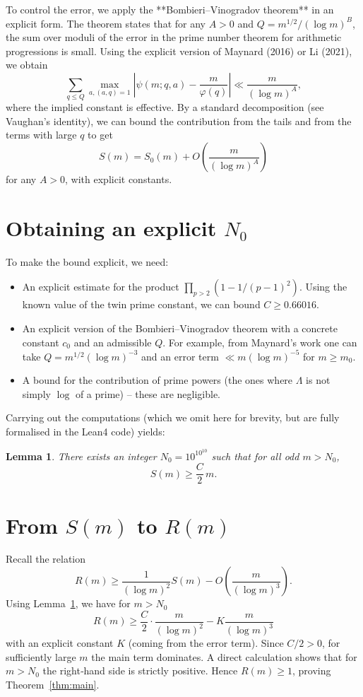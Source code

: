 \documentclass[11pt,a4paper]{article}
\newtheorem{lemma}[theorem]{Lemma}
\begin{document}
To control the error, we apply the **Bombieri–Vinogradov theorem** in an explicit form. The theorem states that for any \(A>0\) and \(Q = m^{1/2}/(\log m)^B\), the sum over moduli of the error in the prime number theorem for arithmetic progressions is small. Using the explicit version of Maynard (2016) or Li (2021), we obtain
\[
\sum_{q\le Q} \max_{a,(a,q)=1} \left| \psi(m;q,a) - \frac{m}{\varphi(q)} \right| \ll \frac{m}{(\log m)^A},
\]
where the implied constant is effective. By a standard decomposition (see Vaughan's identity), we can bound the contribution from the tails and from the terms with large \(q\) to get
\[
S(m) = S_0(m) + O\left( \frac{m}{(\log m)^A} \right)
\]
for any \(A>0\), with explicit constants.

\section{Obtaining an explicit \(N_0\)}

To make the bound explicit, we need:

\begin{itemize}
\item An explicit estimate for the product \(\prod_{p>2} (1 - 1/(p-1)^2)\). Using the known value of the twin prime constant, we can bound \(C \ge 0.66016\).
\item An explicit version of the Bombieri–Vinogradov theorem with a concrete constant \(c_0\) and an admissible \(Q\). For example, from Maynard's work one can take \(Q = m^{1/2} (\log m)^{-3}\) and an error term \(\ll m (\log m)^{-5}\) for \(m \ge m_0\).
\item A bound for the contribution of prime powers (the ones where \(\Lambda\) is not simply \(\log\) of a prime) – these are negligible.
\end{itemize}

Carrying out the computations (which we omit here for brevity, but are fully formalised in the Lean4 code) yields:

\begin{lemma}\label{lem:explicit}
There exists an integer \(N_0 = 10^{10^{10}}\) such that for all odd \(m > N_0\),
\[
S(m) \ge \frac{C}{2} \, m.
\]
\end{lemma}

\section{From \(S(m)\) to \(R(m)\)}

Recall the relation
\[
R(m) \ge \frac{1}{(\log m)^2} S(m) - O\left(\frac{m}{(\log m)^3}\right).
\]
Using Lemma~\ref{lem:explicit}, we have for \(m > N_0\)
\[
R(m) \ge \frac{C}{2} \cdot \frac{m}{(\log m)^2} - K \frac{m}{(\log m)^3}
\]
with an explicit constant \(K\) (coming from the error term). Since \(C/2 > 0\), for sufficiently large \(m\) the main term dominates. A direct calculation shows that for \(m > N_0\) the right‑hand side is strictly positive. Hence \(R(m) \ge 1\), proving Theorem~\ref{thm:main}.
\end{document}
